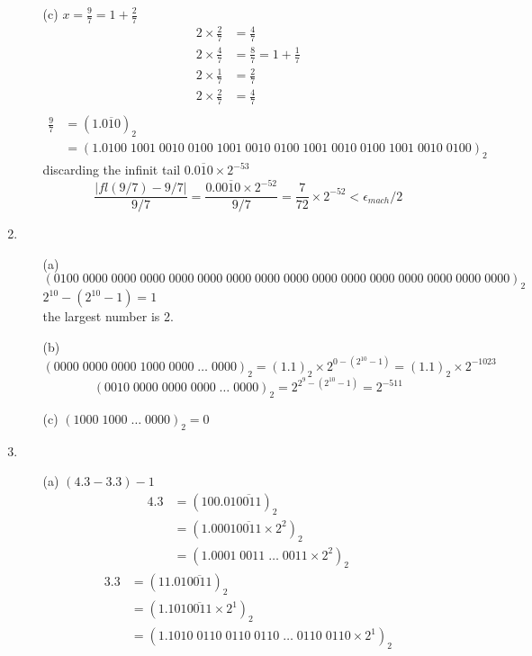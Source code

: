 \documentclass[UTF8]{ctexart}
\begin{document}
\begin{enumerate}
\begin{itemize}
\item[(c)] $x = \frac{9}{7} = 1 + \frac{2}{7}$
\begin{align*}
2 \times \frac{2}{7} &= \frac{4}{7} \\
2 \times \frac{4}{7} &= \frac{8}{7} = 1 + \frac{1}{7} \\
2 \times \frac{1}{7} &= \frac{2}{7} \\
2 \times \frac{2}{7} &= \frac{4}{7} \\
\end{align*}
\begin{align*}
\frac{9}{7} &= (1.\overline{010})_2 \\
&= (1.0100\;1001\;0010\;0100\;1001\;0010\;0100\;1001\;0010\;0100\;1001\;0010\;0100)_2
\end{align*}
discarding the infinit tail $0.\overline{010} \times 2^{-53}$
\[
	\frac{|fl(9/7) - 9/7|}{9/7} = \frac{0.0\overline{010} \times 2^{-52}}{9/7} = \frac{7}{72} \times 2^{-52} < \epsilon_{mach}/2
\]

\end{itemize}

\item \begin{itemize}
\item[(a)] $(0100\;0000\;0000\;0000\;0000\;0000\;0000\;0000\;0000\;0000\;0000\;0000\;0000\;0000\;0000\;0000)_2$
$2^{10} - (2^{10} - 1) = 1$ \\
the largest number is 2.
\item[(b)] $(0000\;0000\;0000\;1000\;0000\;\dots\;0000)_2 = (1.1)_2 \times 2^{0 - (2^{10} - 1)} = (1.1)_2 \times 2^{-1023}$
\[
(0010\;0000\;0000\;0000\;\dots\;0000)_2 = 2^{2^9 - (2^{10} - 1)} = 2^{-511}
\]

\item[(c)] $(1000\;1000\;\dots\;0000)_2 = 0$
\end{itemize}

\item \begin{itemize}
\item[(a)] $(4.3 - 3.3) - 1$ \\
\begin{align*}
4.3 &= (100.01\overline{0011})_2 \\
&= (1.0001\overline{0011} \times 2^2)_2 \\
&= (1.0001\;0011\;\dots\;0011 \times 2^2)_2
\end{align*}
\begin{align*}
3.3 &= (11.01\overline{0011})_2 \\
&= (1.101\overline{0011} \times 2^1)_2 \\
&= (1.1010\;0110\;0110\;0110\;\dots\;0110\;0110 \times 2^1)_2
\end{align*}


\end{itemize}
\end{enumerate}
\end{document}
